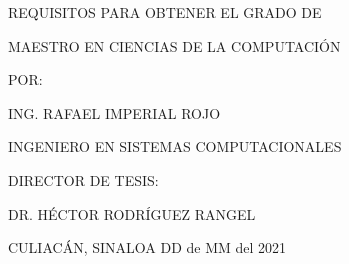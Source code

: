 \begin{titlepage}
\begin{center}
        \vspace{-0.2cm}
        
        {\fontsize{11}{30}\selectfont {} REQUISITOS PARA OBTENER EL GRADO DE}
        
        \vspace{0.5cm}
        {\fontsize{14}{30}\selectfont MAESTRO EN CIENCIAS DE LA COMPUTACIÓN}
        
        
        \vspace{0.5cm}
        
        {\fontsize{14}{30}\selectfont POR:}
        
        \vspace{0.5cm}
        {\fontsize{11}{30}\selectfont ING. RAFAEL IMPERIAL ROJO}
        
        
        {\fontsize{14}{30}\selectfont INGENIERO EN SISTEMAS COMPUTACIONALES }
        
        
        \vspace{0.5cm}
        {\fontsize{14}{30}\selectfont DIRECTOR DE TESIS:}
        
        {\fontsize{11}{30}\selectfont DR. HÉCTOR RODRÍGUEZ RANGEL}
        
        \vspace{2.5cm}
        {\fontsize{14}{30}\selectfont CULIACÁN, SINALOA} \hfill {\fontsize{14}{30}\selectfont DD de MM del 2021}
        
        
    \end{center}

\end{titlepage}